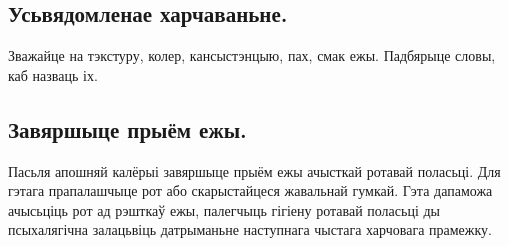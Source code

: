 \subsection{Усьвядомленае харчаваньне.}
Зважайце на тэкстуру, колер, кансыстэнцыю, пах, смак ежы. Падбярыце словы, каб назваць іх.

\subsection{Завяршыце прыём ежы.}
Пасьля апошняй калёрыі завяршыце прыём ежы ачысткай ротавай поласьці. Для гэтага прапалашчыце рот або скарыстайцеся жавальнай гумкай. Гэта дапаможа ачысьціць рот ад рэшткаў ежы, палегчыць гігіену ротавай поласьці ды псыхалягічна залацьвіць датрыманьне наступнага чыстага харчовага прамежку.